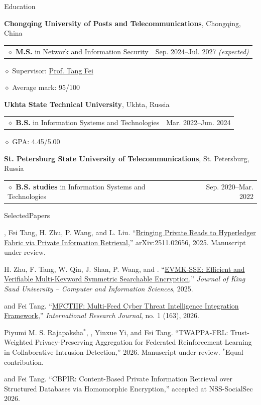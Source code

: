 \documentclass[11pt,a4paper]{article}
\makeatletter
\newcommand{\cvrow}[2]{%
  \noindent
  \begin{minipage}[t]{0.145\textwidth}
    \vspace{0pt}%
    \raggedright
    \fontsize{10.5}{12.5}\selectfont
    #1
  \end{minipage}%
  \hfill
  \begin{minipage}[t]{0.835\textwidth}
    \vspace{0pt}%
    #2
  \end{minipage}\par
}
\newcommand{\pub}[2]{%
  #1 #2\par
  \vspace{0.28em}
}
\newcommand{\eduentry}[2]{%
  \noindent
  \begin{tabularx}{\linewidth}
    {@{}X@{\hspace{0.8em}}r@{}}
    #1 & \small #2
  \end{tabularx}\par
  \vspace{0.15em}
}
\newcommand{\edudetail}[1]{%
  \noindent\hspace*{1.15em}$\diamond$ #1\par
}
\makeatother
\begin{document}
\cvrow{Education}{%
  \raggedright

  \textbf{Chongqing University of Posts and Telecommunications},
  Chongqing, China\par
  \vspace{0.12em}

  \eduentry
    {$\diamond$ \textbf{M.S.} in Network and Information Security}
    {Sep. 2024--Jul. 2027 \textit{(expected)}}

  \edudetail{Supervisor:
    \href{https://faculty.cqupt.edu.cn/tangfei/en/index.htm}{Prof. Tang Fei}}
  \edudetail{Average mark: 95/100}

  \vspace{0.48em}

  \textbf{Ukhta State Technical University},
  Ukhta, Russia\par
  \vspace{0.12em}

  \eduentry
    {$\diamond$ \textbf{B.S.} in Information Systems and Technologies}
    {Mar. 2022--Jun. 2024}

  \edudetail{GPA: 4.45/5.00}

  \vspace{0.48em}

  \textbf{St. Petersburg State University of Telecommunications},
  St. Petersburg, Russia\par
  \vspace{0.12em}

  \eduentry
    {$\diamond$ \textbf{B.S. studies} in Information Systems and Technologies}
    {Sep. 2020--Mar. 2022}
}

\vspace{0.75em}

\cvrow{Selected\newline Papers}{%
  \pub{\underbar{Artur Iasenovets}, Fei Tang, H. Zhu, P. Wang, and L. Liu.}
  {``\href{https://arxiv.org/abs/2511.02656}
  {Bringing Private Reads to Hyperledger Fabric via Private Information Retrieval},''
  arXiv:2511.02656, 2025. Manuscript under review.}

  \pub{H. Zhu, F. Tang, W. Qin, J. Shan, P. Wang, and \underbar{Artur Iasenovets}.}
  {``\href{https://doi.org/10.1007/s44443-025-00405-8}
  {EVMK-SSE: Efficient and Verifiable Multi-Keyword Symmetric Searchable Encryption},''
  \textit{Journal of King Saud University -- Computer and Information Sciences}, 2025.}

  \pub{\underbar{Artur Iasenovets} and Fei Tang.}
  {``\href{https://doi.org/10.60797/IRJ.2026.163.57}
  {MFCTIIF: Multi-Feed Cyber Threat Intelligence Integration Framework},''
  \textit{International Research Journal}, no. 1 (163), 2026.}

  \pub{Piyumi M. S. Rajapaksha$^{*}$, \underbar{Artur Iasenovets$^{*}$},
  Yinxue Yi, and Fei Tang.}
  {``TWAPPA-FRL: Trust-Weighted Privacy-Preserving Aggregation for Federated
  Reinforcement Learning in Collaborative Intrusion Detection,''
  2026. Manuscript under review. $^{*}$Equal contribution.}

  \pub{\underbar{Artur Iasenovets} and Fei Tang.}
  {``CBPIR: Content-Based Private Information Retrieval over Structured Databases via
  Homomorphic Encryption,'' accepted at NSS-SocialSec 2026.}
}
\end{document}
